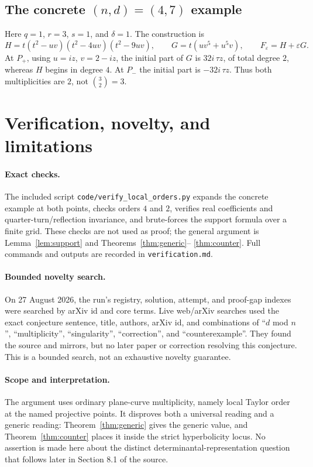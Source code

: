 \documentclass[11pt]{article}
\begin{document}
\subsection*{The concrete $(n,d)=(4,7)$ example}

Here $q=1$, $r=3$, $s=1$, and $\delta=1$.  The construction is
\[
 H=t(t^2-uv)(t^2-4uv)(t^2-9uv),\qquad
 G=t(uv^5+u^5v),\qquad F_\varepsilon=H+\varepsilon G.
\]
At $P_+$, using $u=iz$, $v=2-iz$, the initial part of $G$ is
$32i\,\tau z$, of total degree $2$, whereas $H$ begins in degree $4$.
At $P_-$ the initial part is $-32i\,\tau z$.  Thus both multiplicities are
$2$, not $\binom32=3$.

\section{Verification, novelty, and limitations}

\paragraph{Exact checks.}
The included script \texttt{code/verify\_local\_orders.py} expands the
concrete example at both points, checks orders $4$ and $2$, verifies real
coefficients and quarter-turn/reflection invariance, and brute-forces the
support formula over a finite grid.  These checks are not used as proof; the
general argument is Lemma~\ref{lem:support} and Theorems~\ref{thm:generic}--
\ref{thm:counter}.  Full commands and outputs are recorded in
\texttt{verification.md}.

\paragraph{Bounded novelty search.}
On 27 August 2026, the run's registry, solution, attempt, and proof-gap
indexes were searched by arXiv id and core terms.  Live web/arXiv searches
used the exact conjecture sentence, title, authors, arXiv id, and combinations
of ``$d$ mod $n$'', ``multiplicity'', ``singularity'', ``correction'', and
``counterexample''.  They found the source and mirrors, but no later paper or
correction resolving this conjecture.  This is a bounded search, not an
exhaustive novelty guarantee.

\paragraph{Scope and interpretation.}
The argument uses ordinary plane-curve multiplicity, namely local Taylor
order at the named projective points.  It disproves both a universal reading
and a generic reading: Theorem~\ref{thm:generic} gives the generic value, and
Theorem~\ref{thm:counter} places it inside the strict hyperbolicity locus.
No assertion is made here about the distinct determinantal-representation
question that follows later in Section 8.1 of the source.
\end{document}
